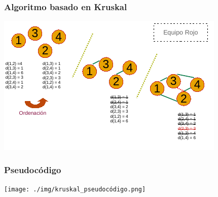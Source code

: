 \documentclass[13pt]{beamer}
\begin{document}
    \begin{frame}
		\frametitle{Algoritmo basado en Kruskal}
		\begin{center}
			\includegraphics[scale=1.5]{./img/DibPropio.pdf}
		\end{center}
	\end{frame}

	\begin{frame}
		\frametitle{Pseudocódigo}
		\begin{center}
			\texttt{[image: ./img/kruskal\_pseudocódigo.png]}
		\end{center}
	\end{frame}
\end{document}
